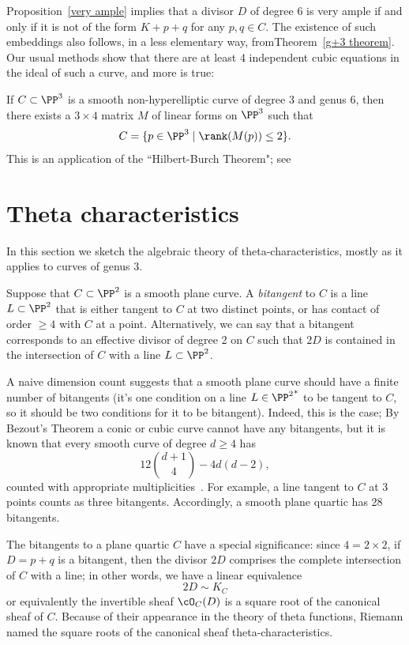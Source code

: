 Proposition~\ref{very ample} implies that a divisor $D$ of degree 6 is very ample if and only if it is not of the form $K+p+q$ for any $p, q \in C$. The existence of such embeddings also follows, in a less elementary way,
 fromTheorem~\ref{g+3 theorem}.  Our usual methods show that there are at least 4 independent
 cubic equations in the ideal of such a curve, and more is true:

\begin{fact}
If $C \subset \PP^3$ is a smooth non-hyperelliptic curve of degree 3 and genus 6, then there exists a $3 \times 4$ matrix $M$ of linear forms on $\PP^3$ such that 
$$
C = \{ p \in \PP^3 \mid \rank(M(p)) \leq 2 \}.
$$
This is an application of the ``Hilbert-Burch Theorem"; see ~\cite{geomsyz}
\end{fact}


\section{Theta characteristics}

In this section we sketch the algebraic theory of theta-characteristics, mostly as it applies to curves of genus 3.

Suppose that $C \subset \PP^2$ is a smooth plane curve. A \emph{bitangent} to $C$ is a line $L \subset \PP^2$ that is either tangent to $C$ at two distinct points, or has contact of order $\geq 4$ with $C$ at a point. Alternatively, we can say that a bitangent  corresponds to an effective divisor of degree 2 on $C$ such that $2D$ is contained in the intersection of $C$ with a line $L \subset \PP^2$.

A naive dimension count suggests that a smooth plane curve should have a finite number of bitangents (it's one condition on a line $L \in {\PP^2}^*$ to be tangent to $C$, so it should be two conditions for it to be bitangent). Indeed, this is the case; By Bezout's Theorem a conic or cubic curve cannot have any bitangents, but it is known that every smooth curve of degree $d \geq 4$ has 
$$
12\binom{d+1}{4} - 4d(d-2),
$$
counted with appropriate multiplicities~\cite[p. 282]{Griffiths-Harris1978}. For example, a line tangent to $C$ at 3 points  counts as three bitangents. Accordingly, a smooth plane quartic has 28 bitangents.

The bitangents to a plane quartic $C$ have a special significance: since $4 = 2 \times 2$, if $D = p+q$ is a bitangent, then the divisor $2D$ comprises the complete intersection of $C$ with a line; in other words, we have a linear equivalence
$$
2D \sim K_C
$$
or equivalently the invertible sheaf $\cO_C(D)$ is a square root of the canonical sheaf of $C$. Because of their appearance in the theory of theta functions, Riemann named the square roots of the canonical sheaf theta-characteristics.

